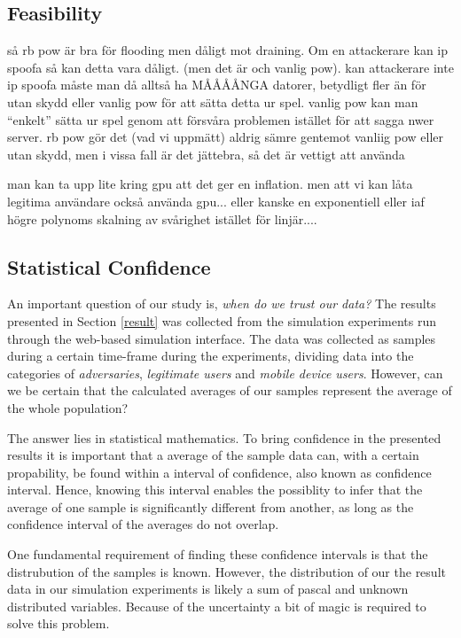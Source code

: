 \subsection{Feasibility}
så rb pow är bra för flooding men dåligt mot draining. Om en attackerare kan ip spoofa så kan detta vara dåligt. (men det är och vanlig pow). kan attackerare inte ip spoofa måste man då alltså ha MÅÅÅÅNGA datorer, betydligt fler än för utan skydd eller vanlig pow för att sätta detta ur spel. vanlig pow kan man ``enkelt'' sätta ur spel genom att försvåra problemen istället för att sagga nwer server. rb pow gör det (vad vi uppmätt) aldrig sämre gentemot vanliig pow eller utan skydd, men i vissa fall är det jättebra, så det är vettigt att använda

man kan ta upp lite kring gpu att det ger en inflation. men att vi kan låta legitima användare också använda gpu... eller kanske en exponentiell eller iaf högre polynoms skalning av svårighet istället för linjär....



\subsection{Statistical Confidence}
An important question of our study is, \emph{when do we trust our data?} The results presented in Section \ref{result} was collected from the simulation experiments run through the web-based simulation interface. The data was collected as samples during a certain time-frame during the experiments, dividing data into the categories of \emph{adversaries}, \emph{legitimate users} and \emph{mobile device users}. However,  can we be certain that the calculated averages of our samples represent the average of the whole population?

The answer lies in statistical mathematics. To bring confidence in the presented results it is important that a average of the sample data can, with a certain propability, be found within a interval of confidence, also known as confidence interval. Hence, knowing this interval enables the possiblity to infer that the average of one sample is significantly different from another, as long as the confidence interval of the averages do not overlap.

One fundamental requirement of finding these confidence intervals is that the distrubution of the samples is known. However, the distribution of our the result data in our simulation experiments is likely a sum of pascal and unknown distributed variables. Because of the uncertainty a bit of magic is required to solve this problem. 

